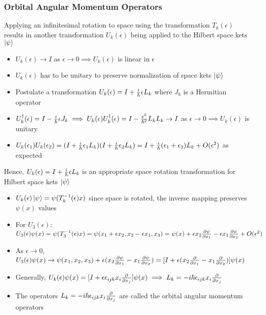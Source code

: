 \documentclass[8pt,t,mathserif,aspectratio=169]{beamer}
\begin{document}
\begin{frame}
  \frametitle{Orbital Angular Momentum Operators}
  \vspace{1mm}
  Applying an infinitesimal rotation to space using the transformation $T_k(\epsilon)$ results in another transformation $U_k(\epsilon)$ being applied to the Hilbert space kets $\ket{\psi}$
  \begin{itemize}
    \item $U_k(\epsilon) \to I$ as $\epsilon \to 0 \implies U_k(\epsilon)$ is linear in $\epsilon$
    \item $U_k(\epsilon)$ has to be unitary to preserve normalization of space kets $\ket{\psi}$
    \item Postulate a transformation $U_k(\epsilon) = I + {i \over \hbar} \epsilon L_k$ where $J_k$ is a Hermitian operator 
    \item $U^{\dagger}_k(\epsilon) = I - {i \over \hbar} \epsilon J_k \implies U_k(\epsilon) U^{\dagger}_k(\epsilon) = I - {\epsilon^{2} \over \hbar^2} L_k L_k \to I$ as $\epsilon \to 0 \implies U_k(\epsilon)$ is unitary 
    \item $U_k(\epsilon_1) U_k(\epsilon_2) = (I + {i \over \hbar} \epsilon_1 L_k) (I + {i \over \hbar} \epsilon_2 L_k) = I + {i \over \hbar} (\epsilon_1 + \epsilon_2) L_k + O(\epsilon^2)$ as expected
  \end{itemize}
  Hence, $U_k(\epsilon) = I + {i \over \hbar} \epsilon L_k$ is an appropriate space rotation transformation for Hilbert space kets $\ket{\psi}$
  \begin{itemize}
    \item $U_k(\epsilon) \ket{\psi} = \psi(T^{-1}_k(\epsilon) x)$ since space is rotated, the inverse mapping preserves $\psi(x)$ values
    \item For $U_3(\epsilon)$: $U_3(\epsilon) \psi(x) = \psi(T^{-1}_3(\epsilon) x) = \psi(x_1 + \epsilon x_2,x_2 - \epsilon x_1,x_3) = \psi(x) + \epsilon x_2 {\partial \psi \over \partial x_1} - \epsilon x_1 {\partial \psi \over \partial x_2} + O(\epsilon^2)$
    \item As $\epsilon \to 0$, $U_3(\epsilon) \psi(x) \to \psi(x_1,x_2,x_3) + \epsilon (x_2 {\partial \psi \over \partial x_1} - x_1 {\partial \psi \over \partial x_2}) = [I + \epsilon (x_2 {\partial \over \partial x_1} - x_1 {\partial \over \partial x_2}) ] \psi(x)$
    \item Generally, $U_k(\epsilon) \psi(x) = [I + \epsilon \epsilon_{ijk} x_i {\partial \over \partial x_j}] \psi(x) \implies L_k = -i \hbar \epsilon_{ijk} x_i {\partial \over \partial x_j}$
    \item The operators $L_k = -i \hbar \epsilon_{ijk} x_i {\partial \over \partial x_j}$ are called the orbital angular momentum operators
  \end{itemize}
\end{frame}
\end{document}
